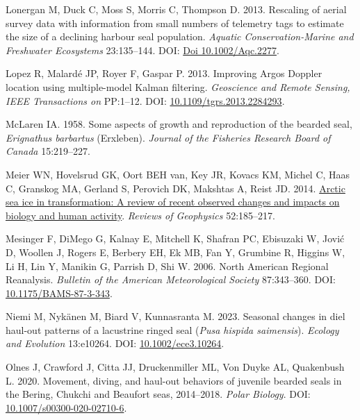 \documentclass[fleqn,10pt,lineno]{wlpeerj} %
\newlength{\cslhangindent}
\newenvironment{CSLReferences}[2] %
 {\begin{list}{}{%
  \setlength{\itemindent}{0pt}
  \setlength{\leftmargin}{0pt}
  \setlength{\parsep}{0pt}
  \ifodd #1
   \setlength{\leftmargin}{\cslhangindent}
   \setlength{\itemindent}{-1\cslhangindent}
  \fi
  \setlength{\itemsep}{#2\baselineskip}}}
 {\end{list}}
\begin{document}
\begin{CSLReferences}{1}{0}
Lonergan M, Duck C, Moss S, Morris C, Thompson D. 2013. Rescaling of aerial survey data with information from small numbers of telemetry tags to estimate the size of a declining harbour seal population. \emph{Aquatic Conservation-Marine and Freshwater Ecosystems} 23:135--144. DOI: \href{https://doi.org/Doi\%2010.1002/Aqc.2277}{Doi 10.1002/Aqc.2277}.

Lopez R, Malardé JP, Royer F, Gaspar P. 2013. Improving Argos Doppler location using multiple-model Kalman filtering. \emph{Geoscience and Remote Sensing, IEEE Transactions on} PP:1--12. DOI: \href{https://doi.org/10.1109/tgrs.2013.2284293}{10.1109/tgrs.2013.2284293}.

McLaren IA. 1958. Some aspects of growth and reproduction of the bearded seal, \emph{Erignathus barbartus} (Erxleben). \emph{Journal of the Fisheries Research Board of Canada} 15:219--227.

Meier WN, Hovelsrud GK, Oort BEH van, Key JR, Kovacs KM, Michel C, Haas C, Granskog MA, Gerland S, Perovich DK, Makshtas A, Reist JD. 2014. \href{https://agupubs.onlinelibrary.wiley.com/doi/abs/10.1002/2013RG000431}{Arctic sea ice in transformation: A review of recent observed changes and impacts on biology and human activity}. \emph{Reviews of Geophysics} 52:185--217.

Mesinger F, DiMego G, Kalnay E, Mitchell K, Shafran PC, Ebisuzaki W, Jović D, Woollen J, Rogers E, Berbery EH, Ek MB, Fan Y, Grumbine R, Higgins W, Li H, Lin Y, Manikin G, Parrish D, Shi W. 2006. North American Regional Reanalysis. \emph{Bulletin of the American Meteorological Society} 87:343--360. DOI: \href{https://doi.org/10.1175/BAMS-87-3-343}{10.1175/BAMS-87-3-343}.

Niemi M, Nykänen M, Biard V, Kunnasranta M. 2023. Seasonal changes in diel haul-out patterns of a lacustrine ringed seal (\emph{Pusa hispida saimensis}). \emph{Ecology and Evolution} 13:e10264. DOI: \href{https://doi.org/10.1002/ece3.10264}{10.1002/ece3.10264}.

Olnes J, Crawford J, Citta JJ, Druckenmiller ML, Von Duyke AL, Quakenbush L. 2020. Movement, diving, and haul-out behaviors of juvenile bearded seals in the Bering, Chukchi and Beaufort seas, 2014--2018. \emph{Polar Biology}. DOI: \href{https://doi.org/10.1007/s00300-020-02710-6}{10.1007/s00300-020-02710-6}.


\end{CSLReferences}
\end{document}
